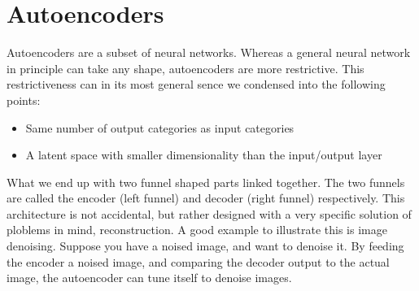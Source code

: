 \chapter*{Autoencoders}
Autoencoders are a subset of neural networks. Whereas a general neural network
 in principle can take any shape, autoencoders are more restrictive.
This restrictiveness can in its most general sence we condensed 
into the following points:
\begin{itemize}
    \item Same number of output categories as input categories  
    \item A latent space with smaller dimensionality than the input/output layer  
\end{itemize}
What we end up with two funnel shaped parts linked together. The two funnels are 
called the encoder (left funnel) and decoder (right funnel) respectively. This architecture is not 
accidental, but rather designed with a very specific solution of ploblems in mind, reconstruction. 
A good example to illustrate this is image denoising. Suppose you have a noised image, 
and want to denoise it. By feeding the encoder a noised image, and comparing the decoder output 
to the actual image, the autoencoder can tune itself to denoise images. 